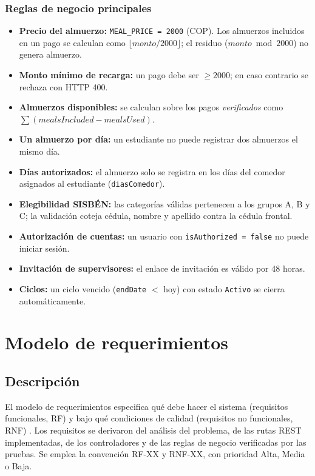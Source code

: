 \documentclass[stu,11pt,floatsintext]{apa7}
\begin{document}
\subsubsection{Reglas de negocio principales}
\begin{itemize}[leftmargin=1.4em]
  \item \textbf{Precio del almuerzo:} \texttt{MEAL\_PRICE = 2000} (COP). Los almuerzos
  incluidos en un pago se calculan como $\lfloor monto/2000 \rfloor$; el residuo
  ($monto \bmod 2000$) no genera almuerzo.
  \item \textbf{Monto mínimo de recarga:} un pago debe ser $\geq 2000$; en caso
  contrario se rechaza con HTTP 400.
  \item \textbf{Almuerzos disponibles:} se calculan sobre los pagos \emph{verificados}
  como $\sum (mealsIncluded - mealsUsed)$.
  \item \textbf{Un almuerzo por día:} un estudiante no puede registrar dos almuerzos el
  mismo día.
  \item \textbf{Días autorizados:} el almuerzo solo se registra en los días del comedor
  asignados al estudiante (\texttt{diasComedor}).
  \item \textbf{Elegibilidad SISBÉN:} las categorías válidas pertenecen a los grupos A,
  B y C; la validación coteja cédula, nombre y apellido contra la cédula frontal.
  \item \textbf{Autorización de cuentas:} un usuario con \texttt{isAuthorized = false}
  no puede iniciar sesión.
  \item \textbf{Invitación de supervisores:} el enlace de invitación es válido por 48
  horas.
  \item \textbf{Ciclos:} un ciclo vencido (\texttt{endDate} $<$ hoy) con estado
  \texttt{Activo} se cierra automáticamente.
\end{itemize}

\section{Modelo de requerimientos}

\subsection{Descripción}
El modelo de requerimientos especifica qué debe hacer el sistema (requisitos funcionales,
RF) y bajo qué condiciones de calidad (requisitos no funcionales, RNF)
\parencite{sommerville2011}. Los requisitos se derivaron del análisis del problema, de
las rutas REST implementadas, de los controladores y de las reglas de negocio
verificadas por las pruebas. Se emplea la convención RF-XX y RNF-XX, con prioridad Alta,
Media o Baja.
\end{document}
